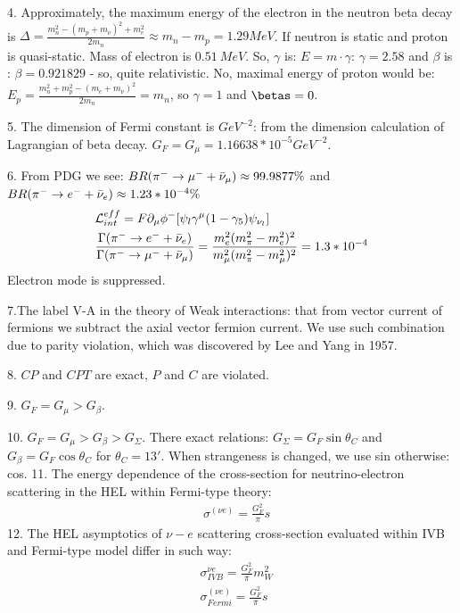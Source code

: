 4. Approximately, the maximum energy of the electron in the neutron beta decay is $\Delta =\frac{m_n^2-(m_p+m_\nu)^2+m_e^2}{2m_n}\approx m_n-m_p=1.29 MeV$. If neutron is static and proton is quasi-static. Mass of electron is $0.51 \ MeV$. So, $\gamma$ is: $E = m \cdot \gamma$: $\gamma=2.58$ and $\beta$ is : $\beta=0.921829$ - so, quite relativistic. No, maximal energy of proton would be: $E_p=\frac{m_n^2+m_p^2-(m_e+m_\nu)^2}{2m_n}=m_n$, so $\gamma=1$ and $\betas=0$.

5. The dimension of Fermi constant is $GeV^{-2}$: from the dimension calculation of Lagrangian of beta decay. $G_F=G_\mu=1.16638*10^{-5} GeV^{-2}$.

6. From PDG we see: $BR(\pi^- \rightarrow \mu^- + \Bar{\nu}_\mu )\approx 99.9877\%$ and $BR(\pi^- \rightarrow e^- + \Bar{\nu}_e )\approx 1.23*10^{-4}\%$
\begin{equation}
\begin{split}
&\mathcal{L}_{int}^{eff}=F \partial_\mu \phi^- [\psi_l \gamma^\mu (1-\gamma_5)\psi_{\nu_l}]\\
&\frac{\Gamma(\pi^- \rightarrow e^- + \Bar{\nu}_e )}{\Gamma(\pi^- \rightarrow \mu^- + \Bar{\nu}_\mu )}=\frac{m_e^2(m_\pi^2-m_e^2)^2}{m_\mu^2(m_\pi^2-m_\mu^2)^2}=1.3*10^{-4}\\
\end{split}
\end{equation}
Electron mode is suppressed. 

7.The label V-A in the theory of Weak interactions: that from vector current of fermions we subtract the axial vector fermion current. We use such combination due to parity violation, which was discovered by Lee and Yang in 1957.

8. $CP$ and $CPT$ are exact, $P$ and $C$ are violated.

9. $G_F=G_\mu>G_\beta$.

10. $G_F=G_\mu>G_\beta>G_\Sigma$. There exact relations: $G_\Sigma = G_F \sin \theta_C$ and $G_\beta = G_F \cos \theta_C$ for $\theta_C=13'$. When strangeness is changed, we use sin otherwise: cos.
11. The energy dependence of the cross-section for neutrino-electron scattering in the HEL within Fermi-type theory:
\begin{equation}
\begin{split}
&\sigma^{(\nu e)}=\frac{G_F^2}{\pi}s
\end{split}
\end{equation}
12. The HEL asymptotics of $\nu-e$ scattering cross-section evaluated within IVB and Fermi-type model differ in such way:
\begin{equation}
\begin{split}
&\sigma^{\nu e}_{IVB}=\frac{G_F^2}{\pi}m_W^2\\
&\sigma^{(\nu e)}_{Fermi}=\frac{G_F^2}{\pi}s\\
\end{split}
\end{equation}

